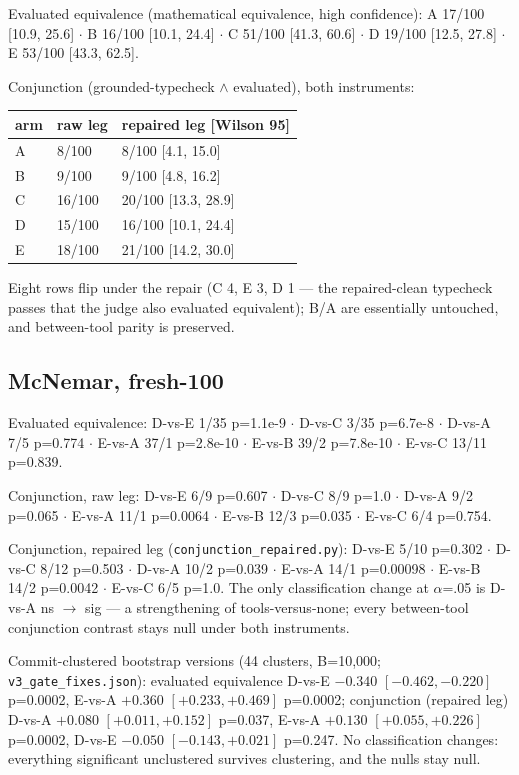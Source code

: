 \documentclass[10pt]{article}
\newcommand{\code}[1]{\texttt{#1}}
\begin{document}
Evaluated equivalence (mathematical equivalence, high confidence):
A 17/100 [10.9, 25.6] $\cdot$ B 16/100 [10.1, 24.4] $\cdot$ C 51/100
[41.3, 60.6] $\cdot$ D 19/100 [12.5, 27.8] $\cdot$ E 53/100
[43.3, 62.5].

Conjunction (grounded-typecheck $\wedge$ evaluated), both
instruments:

\begin{center}\footnotesize
\begin{tabular}{@{}lll@{}}
\toprule
arm & raw leg & repaired leg [Wilson 95] \\
\midrule
A & 8/100 & 8/100 [4.1, 15.0] \\
B & 9/100 & 9/100 [4.8, 16.2] \\
C & 16/100 & 20/100 [13.3, 28.9] \\
D & 15/100 & 16/100 [10.1, 24.4] \\
E & 18/100 & 21/100 [14.2, 30.0] \\
\bottomrule
\end{tabular}
\end{center}

Eight rows flip under the repair (C 4, E 3, D 1 --- the repaired-clean
typecheck passes that the judge also evaluated equivalent); B/A are
essentially untouched, and between-tool parity is preserved.

\subsection{McNemar, fresh-100}\label{s11:mcnemar}

Evaluated equivalence: D-vs-E 1/35 p=1.1e-9 $\cdot$ D-vs-C 3/35
p=6.7e-8 $\cdot$ D-vs-A 7/5 p=0.774 $\cdot$ E-vs-A 37/1 p=2.8e-10
$\cdot$ E-vs-B 39/2 p=7.8e-10 $\cdot$ E-vs-C 13/11 p=0.839.

Conjunction, raw leg: D-vs-E 6/9 p=0.607 $\cdot$ D-vs-C 8/9 p=1.0
$\cdot$ D-vs-A 9/2 p=0.065 $\cdot$ E-vs-A 11/1 p=0.0064 $\cdot$ E-vs-B
12/3 p=0.035 $\cdot$ E-vs-C 6/4 p=0.754.

Conjunction, repaired leg (\code{conjunction\_repaired.py}): D-vs-E
5/10 p=0.302 $\cdot$ D-vs-C 8/12 p=0.503 $\cdot$ D-vs-A 10/2 p=0.039
$\cdot$ E-vs-A 14/1 p=0.00098 $\cdot$ E-vs-B 14/2 p=0.0042 $\cdot$
E-vs-C 6/5 p=1.0. The only classification change at $\alpha$=.05 is
D-vs-A ns $\to$ sig --- a strengthening of tools-versus-none; every
between-tool conjunction contrast stays null under both instruments.

Commit-clustered bootstrap versions (44 clusters, B=10,000;
\code{v3\_gate\_fixes.json}): evaluated equivalence D-vs-E $-0.340$
$[-0.462, -0.220]$ p=0.0002, E-vs-A $+0.360$ $[+0.233, +0.469]$
p=0.0002; conjunction (repaired leg) D-vs-A $+0.080$
$[+0.011, +0.152]$ p=0.037, E-vs-A $+0.130$ $[+0.055, +0.226]$
p=0.0002, D-vs-E $-0.050$ $[-0.143, +0.021]$ p=0.247. No
classification changes: everything significant unclustered survives
clustering, and the nulls stay null.
\end{document}
